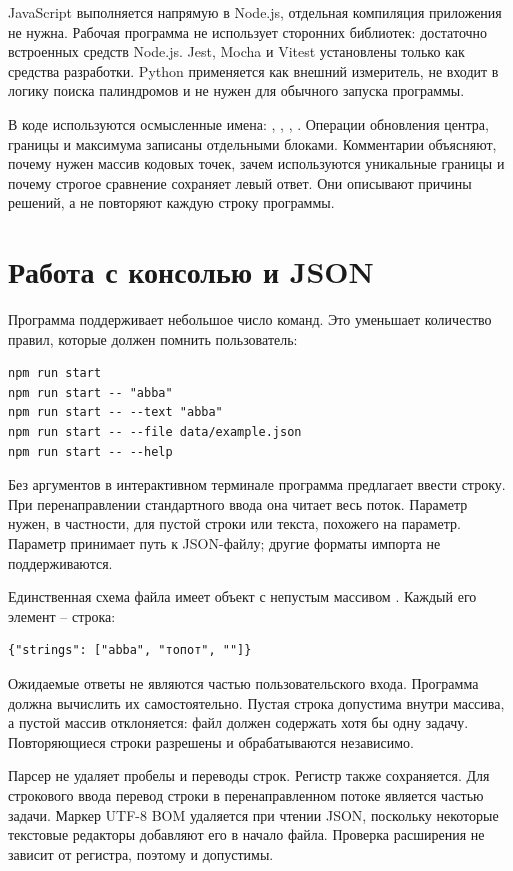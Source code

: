 JavaScript выполняется напрямую в Node.js, отдельная компиляция приложения не нужна. Рабочая программа не использует сторонних библиотек: достаточно встроенных средств Node.js. Jest, Mocha и Vitest установлены только как средства разработки. Python применяется как внешний измеритель, не входит в логику поиска палиндромов и не нужен для обычного запуска программы.

В коде используются осмысленные имена: , , , . Операции обновления центра, границы и максимума записаны отдельными блоками. Комментарии объясняют, почему нужен массив кодовых точек, зачем используются уникальные границы и почему строгое сравнение сохраняет левый ответ. Они описывают причины решений, а не повторяют каждую строку программы.

\section{Работа с консолью и JSON}
Программа поддерживает небольшое число команд. Это уменьшает количество правил, которые должен помнить пользователь:
\begin{lstlisting}
npm run start
npm run start -- "abba"
npm run start -- --text "abba"
npm run start -- --file data/example.json
npm run start -- --help
\end{lstlisting}
Без аргументов в интерактивном терминале программа предлагает ввести строку. При перенаправлении стандартного ввода она читает весь поток. Параметр  нужен, в частности, для пустой строки или текста, похожего на параметр. Параметр  принимает путь к JSON-файлу; другие форматы импорта не поддерживаются.

Единственная схема файла имеет объект с непустым массивом . Каждый его элемент -- строка:
\begin{Verbatim}[fontsize=\small,frame=single]
{"strings": ["abba", "топот", ""]}
\end{Verbatim}
Ожидаемые ответы не являются частью пользовательского входа. Программа должна вычислить их самостоятельно. Пустая строка допустима внутри массива, а пустой массив отклоняется: файл должен содержать хотя бы одну задачу. Повторяющиеся строки разрешены и обрабатываются независимо.

Парсер не удаляет пробелы и переводы строк. Регистр также сохраняется. Для строкового ввода перевод строки в перенаправленном потоке является частью задачи. Маркер UTF-8 BOM удаляется при чтении JSON, поскольку некоторые текстовые редакторы добавляют его в начало файла. Проверка расширения не зависит от регистра, поэтому  и  допустимы.

